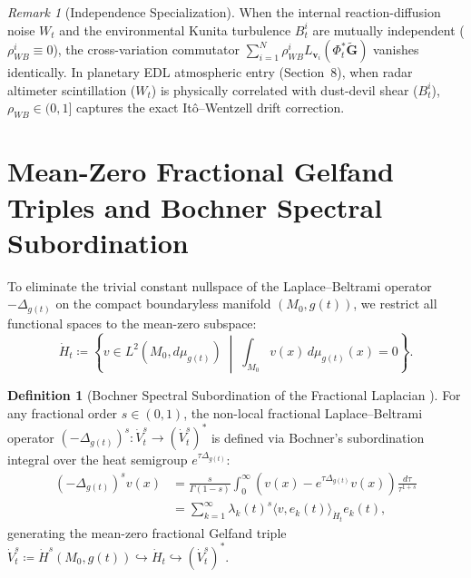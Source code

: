 \documentclass[11pt,a4paper,reqno]{article}
\def\mathrm#1{#1}%
\def\mathcal#1{#1}%
\theoremstyle{plain}
\theoremstyle{definition}
\newtheorem{definition}[theorem]{Definition}
\theoremstyle{remark}
\newtheorem{remark}[theorem]{Remark}
\numberwithin{equation}{section}
\begin{document}
\begin{remark}[Independence Specialization]\label{rem:independence_spec}
When the internal reaction-diffusion noise $W_t$ and the environmental Kunita turbulence $B_t^i$ are mutually independent ($\rho_{WB}^i \equiv 0$), the cross-variation commutator $\sum_{i=1}^N \rho_{WB}^i \mathcal{L}_{\mathbf{v}_i}(\Phi_t^*\tilde{\mathbf{G}})$ vanishes identically. In planetary EDL atmospheric entry (Section~8), when radar altimeter scintillation ($W_t$) is physically correlated with dust-devil shear ($B_t^i$), $\rho_{WB} \in (0, 1]$ captures the exact It\^o--Wentzell drift correction.
\end{remark}

\section{Mean-Zero Fractional Gelfand Triples and Bochner Spectral Subordination}
\label{sec:gelfand_triple}

To eliminate the trivial constant nullspace of the Laplace--Beltrami operator $-\Delta_{g(t)}$ on the compact boundaryless manifold $(\mathcal{M}_0, g(t))$, we restrict all functional spaces to the mean-zero subspace:
\begin{equation}\label{eq:mean_zero_hilbert}
  \dot{H}_t \coloneqq \left\{ v \in L^2(\mathcal{M}_0, \mathrm{d}\mu_{g(t)}) \;\middle|\; \int_{\mathcal{M}_0} v(x)\,\mathrm{d}\mu_{g(t)}(x) = 0 \right\}.
\end{equation}

\begin{definition}[Bochner Spectral Subordination of the Fractional Laplacian \cite{caffarelli2007extension, kwasnicki2017ten}]
For any fractional order $s \in (0, 1)$, the non-local fractional Laplace--Beltrami operator $(-\Delta_{g(t)})^s : \dot{V}_t^s \to (\dot{V}_t^s)^*$ is defined via Bochner's subordination integral over the heat semigroup $\mathrm{e}^{\tau \Delta_{g(t)}}$:
\begin{equation}\label{eq:bochner_subordination}
\begin{aligned}
  (-\Delta_{g(t)})^s v(x) &= \frac{s}{\Gamma(1-s)} \int_0^\infty \left( v(x) - \mathrm{e}^{\tau \Delta_{g(t)}} v(x) \right) \frac{\mathrm{d}\tau}{\tau^{1+s}} \\
  &= \sum_{k=1}^\infty \lambda_k(t)^s \langle v, e_k(t) \rangle_{\dot{H}_t} e_k(t),
\end{aligned}
\end{equation}
generating the mean-zero fractional Gelfand triple $\dot{V}_t^s \coloneqq \dot{H}^s(\mathcal{M}_0, g(t)) \hookrightarrow \dot{H}_t \hookrightarrow (\dot{V}_t^s)^*$.
\end{definition}
\end{document}
